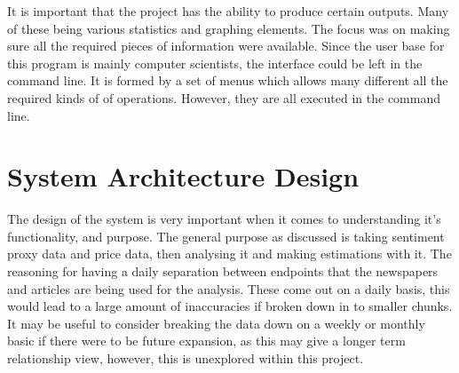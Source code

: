 It is important that the project has the ability to produce certain outputs. Many of these being various statistics and graphing elements. The focus was on making sure all the required pieces of information were available. Since the user base for this program is mainly computer scientists, the interface could be left in the command line. It is formed by a set of menus which allows many different all the required kinds of of operations. However, they are all executed in the command line.

\section{System Architecture Design}

The design of the system is very important when it comes to understanding it's functionality, and purpose. The general purpose as discussed is taking sentiment proxy data and price data, then analysing it and making estimations with it. The reasoning for having a daily separation between endpoints that the newspapers and articles are being used for the analysis. These come out on a daily basis, this would lead to a large amount of inaccuracies if broken down in to smaller chunks. It may be useful to consider breaking the data down on a weekly or monthly basic if there were to be future expansion, as this may give a longer term relationship view, however, this is unexplored within this project.

